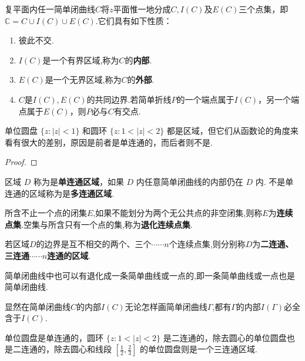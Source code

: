 \documentclass[../../main.tex]{subfiles}%
\begin{document}
\begin{theorem}[Jordan定理]\label{theorem:Jordan定理}
复平面内任一简单闭曲线$C$将$z$平面惟一地分成$C,I(C)$及$E(C)$三个点集，即$\mathbb{C}=C\cup I(C)\cup E(C)$.它们具有如下性质：
\begin{enumerate}[(1)]
\item 彼此不交.

\item $I(C)$是一个有界区域,称为$C$的\textbf{内部}.

\item $E(C)$是一个无界区域,称为$C$的\textbf{外部}.

\item $C$是$I(C),E(C)$的共同边界.若简单折线$P$的一个端点属于$I(C)$，另一个端点属于$E(C)$，则$P$必与$C$有交点.
\end{enumerate}
\end{theorem}
\begin{note}
单位圆盘 $\{ z: \vert z \vert < 1\}$ 和圆环 $\{ z: 1 < \vert z \vert < 2\}$ 都是区域，但它们从函数论的角度来看有很大的差别，原因是前者是单连通的，而后者则不是.
\end{note}
\begin{proof}

\end{proof}

\begin{definition}
区域 $D$ 称为是\textbf{单连通区域}，如果 $D$ 内任意简单闭曲线的内部仍在 $D$ 内. 不是单连通的区域称为是\textbf{多连通区域}.

所含不止一个点的闭集$E$,如果不能划分为两个无公共点的非空闭集,则称$E$为\textbf{连续点集}.空集与所含只有一个点的集,称为\textbf{退化连续点集}.

若区域$D$的边界是互不相交的两个、三个$\cdots\cdots n$个连续点集,则分别称$D$为\textbf{二连通、三连通}$\cdots\cdots n$\textbf{连通的区域}.
\end{definition}
\begin{remark}
简单闭曲线中也可以有退化成一条简单曲线或一点的,即一条简单曲线或一点也是简单闭曲线.
\end{remark}
\begin{note}
显然在简单闭曲线$C$的内部$I(C)$无论怎样画简单闭曲线$\varGamma$,都有$\varGamma$的内部$I(\varGamma)$必全含于$I(C)$.
\end{note}

\begin{example}
单位圆盘是单连通的，圆环 $\{ z: 1 < \vert z \vert < 2\}$ 是二连通的，除去圆心的单位圆盘也是二连通的，除去圆心和线段 $\left[ \frac{1}{2}, \frac{2}{3} \right]$ 的单位圆盘则是一个三连通区域.
\end{example}
\end{document}
